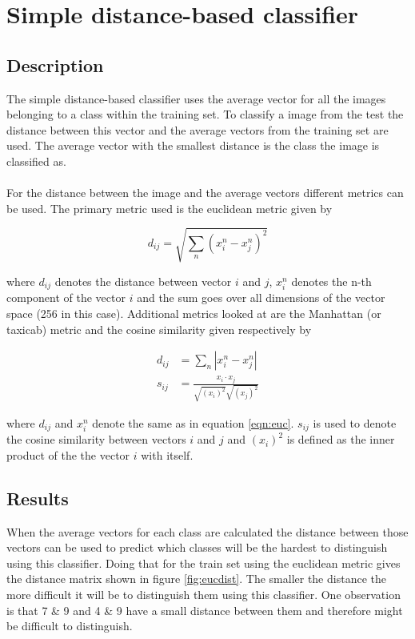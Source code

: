 \documentclass[10 pt, a4paper]{article}
\begin{document}
\section{Simple distance-based classifier} \label{sec:dist}

\subsection{Description}

The simple distance-based classifier uses the average vector for all the images belonging to a class within the training set. To classify a image from the test the distance between this vector and the average vectors from the training set are used. The average vector with the smallest distance is the class the image is classified as.
\\
\\
For the distance between the image and the average vectors different metrics can be used. The primary metric used is the euclidean metric given by 

\begin{equation} 
d_{ij} = \sqrt{\sum_n (x^n_i - x^n_j)^2}
\label{eqn:euc}
\end{equation}

where $d_{ij}$ denotes the distance between vector $i$ and $j$, $x^n_i$ denotes the n-th component of the vector $i$ and the sum goes over all dimensions of the vector space (256 in this case). Additional metrics looked at are the Manhattan (or taxicab) metric and the cosine similarity given respectively by

\begin{align}
d_{ij} &= \sum_n \left| x_i^n - x_j^n \right| \label{eqn:man}\\
s_{ij} &= \frac{x_i \cdot x_j}{\sqrt{(x_i)^2} \sqrt{(x_j)^2}} \label{eqn:cos}
\end{align}

where $d_{ij}$ and $x^n_i$ denote the same as in equation \ref{eqn:euc}. $s_{ij}$ is used to denote the cosine similarity between vectors $i$ and $j$ and $(x_i)^2$ is defined as the inner product of the the vector $i$ with itself. 

\subsection{Results}

When the average vectors for each class are calculated the distance between those vectors can be used to predict which classes will be the hardest to distinguish using this classifier. Doing that for the train set using the euclidean metric gives the distance matrix shown in figure \ref{fig:eucdist}. The smaller the distance the more difficult it will be to distinguish them using this classifier. One observation is that 7 \& 9 and 4 \& 9 have a small distance between them and therefore might be difficult to distinguish.
\end{document}

